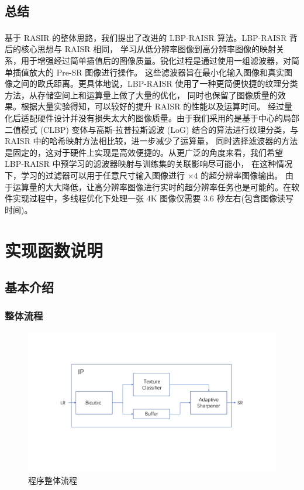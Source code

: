 \documentclass[12pt, a4paper, oneside]{ctexbook}
\begin{document}
	\section{总结}
	基于 RASIR\textsuperscript{\cite{1}} 的整体思路，我们提出了改进的 LBP-RAISR 算法。LBP-RAISR 背后的核心思想与 RAISR 相同，
	学习从低分辨率图像到高分辨率图像的映射关系，用于增强经过简单插值后的图像质量。锐化过程是通过使用一组滤波器，对简单插值放大的 Pre-SR 图像进行操作。
	这些滤波器旨在最小化输入图像和真实图像之间的欧氏距离。更具体地说，LBP-RAISR 使用了一种更简便快捷的纹理分类方法，从存储空间上和运算量上做了大量的优化，
	同时也保留了图像质量的效果。根据大量实验得知，可以较好的提升 RAISR 的性能以及运算时间。
	经过量化后适配硬件设计并没有损失太大的图像质量。由于我们采用的是基于中心的局部二值模式 (CLBP) 变体与高斯-拉普拉斯滤波 (LoG) 结合的算法进行纹理分类，与 RAISR 中的哈希映射方法相比较，进一步减少了运算量，
	同时选择滤波器的方法是固定的，这对于硬件上实现是高效便捷的。从更广泛的角度来看，我们希望 LBP-RAISR 中预学习的滤波器映射与训练集的关联影响尽可能小，
	在这种情况下，学习的过滤器可以用于任意尺寸输入图像进行 $\times4$ 的超分辨率图像输出。
	由于运算量的大大降低，让高分辨率图像进行实时的超分辨率任务也是可能的。在软件实现过程中，多线程优化下处理一张 4K 图像仅需要 3.6 秒左右(包含图像读写时间)。
	
	
	
		
	\chapter{实现函数说明}
		\section{基本介绍}
		\subsection{整体流程}
		\begin{figure}[h]
			\centering
			\includegraphics[scale=0.5]{pic/overview}
			\caption{程序整体流程}
			\label{fig:overview}
		\end{figure}
\end{document}
